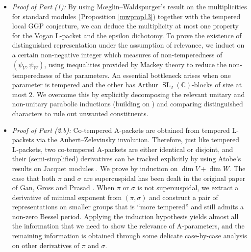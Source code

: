 \documentclass[11pt,letterpaper]{amsart}
\theoremstyle{plain}
\numberwithin{theorem}{section}
\numberwithin{equation}{subsection}
\theoremstyle{remark}
\newcommand{\SL}{\operatorname{SL}}
\newcommand{\C}{\mathbb{C}}
\begin{document}
\begin{itemize}
    \item \emph{Proof of Part (1):} By using M{\oe}glin--Waldspurger's result on the multiplicities for standard modules (Proposition \ref{mwprop13}) together with the tempered local GGP conjecture, we can deduce the multiplicity at most one property for the Vogan L-packet and the epsilon dichotomy. To prove the existence of distinguished representation under the assumption of relevance, we induct on a certain non-negative integer which measures of non-temperedness of $\left(\psi_V, \psi_W\right)$, using inequalities provided by Mackey theory to reduce the non-temperedness of the parameters. An essential bottleneck arises when one parameter is tempered and the other has Arthur $\SL_2(\C)$-blocks of size at most $2$. %
    We overcome this by explicitly decomposing the relevant unitary and non-unitary parabolic inductions (building on \cite{MR4055180, MR4412277, clw26}) and comparing distinguished characters to rule out unwanted constituents.

    \vskip 5pt

    \item \emph{Proof of Part (2.b):} Co-tempered A-packets are obtained from tempered L-packets via the Aubert--Zelevinsky involution. Therefore, just like tempered L-packets, two co-tempered A-packets are either identical or disjoint, and their (semi-simplified) derivatives can be tracked explicitly by using Atobe's results on Jacquet modules \cite{MR4055180}. We prove by induction on $\dim V + \dim W$. The case that both $\pi$ and $\sigma$ are supercuspidal has been dealt in the original paper of Gan, Gross and Prasad \cite[Thm. 7.7]{MR4190046}. When $\pi$ or $\sigma$ is not supercuspidal, we extract a derivative of minimal exponent from $\left(\pi,\sigma\right)$ and construct a pair of representations on smaller groups that is ``more tempered'' and still admits a non-zero Bessel period. Applying the induction hypothesis yields almost all the information that we need to show the relevance of A-parameters, and the remaining information is obtained through some delicate case-by-case analysis on other derivatives of $\pi$ and $\sigma$.
\end{itemize}

\vskip 5pt
\end{document}
